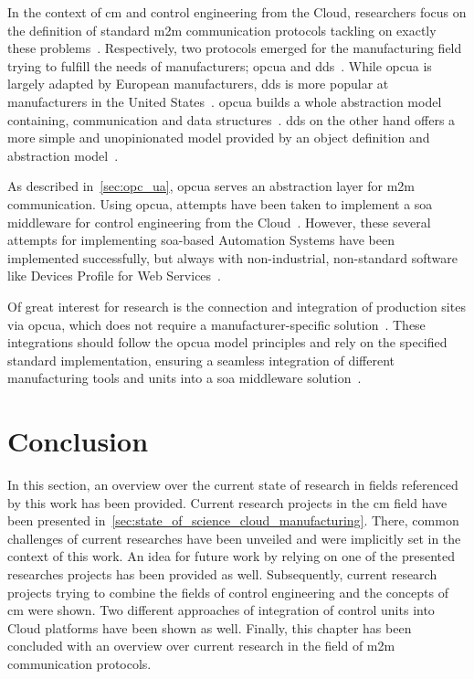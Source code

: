 \documentclass[
a4paper,
twoside,
headsepline,
cleardoublepage=empty,
parskip=half,
draft=false
]{scrbook}
\begin{document}
			In the context of \gls{cm} and control engineering from the Cloud, researchers focus on the definition of standard \gls{m2m} communication protocols tackling on exactly these problems~\cite{lewis2018system}.
			Respectively, two protocols emerged for the manufacturing field trying to fulfill the needs of manufacturers; \gls{opcua} and \gls{dds}~\cite{peters2018opc}.
			While \gls{opcua} is largely adapted by European manufacturers, \gls{dds} is more popular at manufacturers in the United States~\cite{muller2017developing}.
			\gls{opcua} builds a whole abstraction model containing, communication and data structures~\cite{muller2017developing}.
			\gls{dds} on the other hand offers a more simple and unopinionated model provided by an object definition and abstraction model~\cite{muller2017developing}.
			
			As described in~\cref{sec:opc_ua}, \gls{opcua} serves an abstraction layer for \gls{m2m} communication. Using \gls{opcua}, attempts have been taken to implement a \gls{soa} middleware for control engineering from the Cloud~\cite{melik2012towards}.
			However, these several attempts for implementing \gls{soa}-based Automation Systems have been implemented successfully, but always with non-industrial, non-standard software like Devices Profile for Web Services~\cite{luo2017opc}.
			
	\newpage
			
			Of great interest for research is the connection and integration of production sites via \gls{opcua}, which does not require a manufacturer-specific solution~\cite{luo2017opc}. 
			These integrations should follow the \gls{opcua} model principles and rely on the specified standard implementation, ensuring a seamless integration of different manufacturing tools and units into a \gls{soa} middleware solution~\cite{luo2017opc}.
			
		\section{Conclusion}\label{sec:state_of_the_research_conclusion}
		
			In this section, an overview over the current state of research in fields referenced by this work has been provided.
			Current research projects in the \gls{cm} field have been presented in~\cref{sec:state_of_science_cloud_manufacturing}.
			There, common challenges of current researches have been unveiled and were implicitly set in the context of this work.
			An idea for future work by relying on one of the presented researches projects has been provided as well.
			Subsequently, current research projects trying to combine the fields of control engineering and the concepts of \gls{cm} were shown.
			Two different approaches of integration of control units into Cloud platforms have been shown as well.
			Finally, this chapter has been concluded with an overview over current research in the field of \gls{m2m} communication protocols.
			
\end{document}
